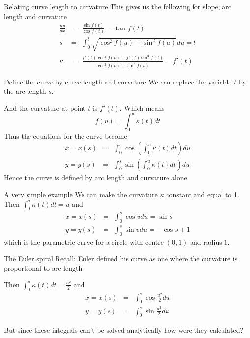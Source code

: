 \documentclass{beamer}
\begin{document}
\begin{frame}{Relating curve length to curvature}
	This gives us the following for slope, arc length and curvature
	\begin{eqnarray*}
	\frac{dy}{dx} &=& \frac{\sin f(t)}{\cos f(t)} = \tan f(t) \\
 	s &=& \int_0^t \sqrt{\cos^2 f(u) + \sin^2 f(u)} du = t \\
 	\kappa &=& \frac{f'(t) \cos^2 f(t) + f'(t) \sin^2 f(t)}{\cos^2 f(t) + \sin^2 f(t)} = f'(t)
 \end{eqnarray*}
\end{frame}

\begin{frame}{Define the curve by curve length and curvature}
	We can replace the variable $t$ by the arc length $s$.
	 
	And the curvature at point $t$ is $f'(t)$. Which means
	 \[
	 f(u) = \int_{0}^{u} \kappa(t) dt
	 \]
	Thus the equations for the curve become
	\begin{eqnarray*}
	x = x(s) &=& \int_{0}^{s} \cos \left( \int_0^u \kappa(t) dt \right) du \\
	y = y(s) &=& \int_{0}^{s} \sin \left( \int_0^u \kappa(t) dt \right) du
	\end{eqnarray*}
	Hence the curve is defined by arc length and curvature alone.
\end{frame}

\begin{frame}{A very simple example}
	We can make the curvature $\kappa$ constant and equal to 1. Then 
	$ \int_0^u \kappa(t) dt = u $ and
	\begin{eqnarray*}
		x = x(s) &=& \int_{0}^{s} \cos u du = \sin s\\
		y = y(s) &=& \int_{0}^{s} \sin u du = - \cos s + 1
	\end{eqnarray*}
	which is the parametric curve for a circle with centre $(0, 1)$ and radius $1$.
	
\end{frame}


\begin{frame}{The Euler spiral}
	Recall: Euler defined his curve as one where the curvature is proportional to arc length.
	
	\begin{center}
	\end{center}
	Then 
	$ \int_0^u \kappa(t) dt = \frac{u^2}{2} $ and
	\begin{eqnarray*}
		x = x(s) &=& \int_{0}^{s} \cos \frac{u^2}{2} du\\
		y = y(s) &=& \int_{0}^{s} \sin \frac{u^2}{2} du
	\end{eqnarray*}

	But since these integrals can't be solved analytically how were they calculated?
\end{frame}
\end{document}
